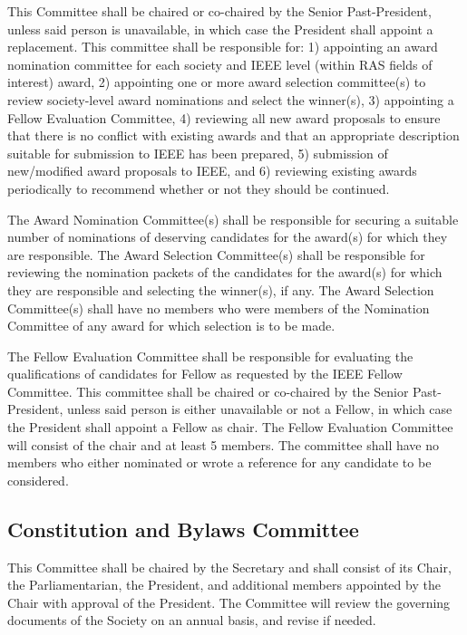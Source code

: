 \documentclass[10pt]{article}
\begin{document}
This Committee shall be chaired or co-chaired by the Senior Past-President, unless said person is unavailable, in which case the President shall appoint a replacement. This committee shall be responsible for: 1) appointing an award nomination committee for each society and IEEE level (within RAS fields of interest) award, 2) appointing one or more award selection committee(s) to review society-level award nominations and select the winner(s), 3) appointing a Fellow Evaluation Committee, 4) reviewing all new award proposals to ensure that there is no conflict with existing awards and that an appropriate description suitable for submission to IEEE has been prepared, 5) submission of new/modified award proposals to IEEE, and 6) reviewing existing awards periodically to recommend whether or not they should be continued.  

The Award Nomination Committee(s) shall be responsible for securing a suitable number of nominations of deserving candidates for the award(s) for which they are responsible.  The Award Selection Committee(s) shall be responsible for reviewing the nomination packets of the candidates for the award(s) for which they are responsible and selecting the winner(s), if any. The Award Selection Committee(s) shall have no members who were members of the Nomination Committee of any award for which selection is to be made.

The Fellow Evaluation Committee shall be responsible for evaluating the qualifications of candidates for Fellow as requested by the IEEE Fellow Committee.  This committee shall be chaired or co-chaired by the Senior Past-President, unless said person is either unavailable or not a Fellow, in which case the President shall appoint a Fellow as chair. The Fellow Evaluation Committee will consist of the chair and at least 5 members. The committee shall have no members who either nominated or wrote a reference for any candidate to be considered.


\subsection{Constitution and Bylaws Committee}

This Committee shall be chaired by the Secretary and shall consist of its Chair, the Parliamentarian, the President, and additional members appointed by the Chair with approval of the President. The Committee will review the governing documents of the Society on an annual basis, and revise if needed.
\end{document}
